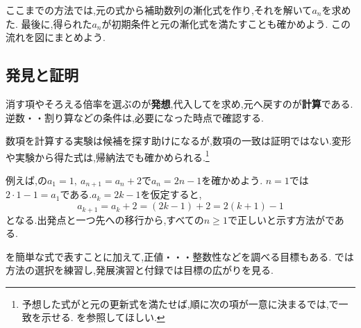     ここまでの方法では,元の式から補助数列の漸化式を作り,それを解いて$a_n$を求めた.
    最後に,得られた$a_n$が初期条件と元の漸化式を満たすことも確かめよう.
    この流れを図にまとめよう.
    \BookFigApproach

  \subsection{発見と証明}

  消す項やそろえる倍率を選ぶのが\textbf{発想},代入してを求め,元へ戻すのが\textbf{計算}である.
  逆数・・割り算などの条件は,必要になった時点で確認する.

  数項を計算する実験は候補を探す助けになるが,数項の一致は証明ではない.変形や実験から得た式は,帰納法でも確かめられる.\footnote{予想した式がと元の更新式を満たせば,順に次の項が一意に決まるでは,で一致を示せる.
  を参照してほしい.}

  例えば,の$a_1=1,\ a_{n+1}=a_n+2$で$a_n=2n-1$を確かめよう.
  $n=1$では$2\cdot1-1=a_1$である.$a_k=2k-1$を仮定すると,
  \[
    a_{k+1}=a_k+2=(2k-1)+2=2(k+1)-1
  \]
  となる.出発点と一つ先への移行から,すべての$n\ge1$で正しいと示す方法が\mbox{}である.

  を簡単な式で表すことに加えて,正値・・・整数性などを調べる目標もある.
  では方法の選択を練習し,発展演習と付録では目標の広がりを見る.
